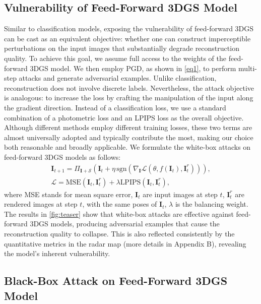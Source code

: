 \documentclass[runningheads]{llncs}
\begin{document}
\subsection{Vulnerability of Feed-Forward 3DGS Model}
Similar to classification models, exposing the vulnerability of feed-forward 3DGS can be cast as an equivalent objective: whether one can construct imperceptible perturbations on the input images that substantially degrade reconstruction quality. To achieve this goal, we assume full access to the weights of the feed-forward 3DGS model. We then employ PGD, as shown in \cref{eq1}, to perform multi-step attacks and generate adversarial examples. Unlike classification, reconstruction does not involve discrete labels. Nevertheless, the attack objective is analogous: to increase the loss by crafting the manipulation of the input along the gradient direction. Instead of a classification loss, we use a standard combination of a photometric loss and an LPIPS loss as the overall objective. Although different methods employ different training losses, these two terms are almost universally adopted and typically contribute the most, making our choice both reasonable and broadly applicable. We formulate the white-box attacks on feed-forward 3DGS models as follows:
\begin{gather}
\label{pgd eq}
    \bm{I}_{t+1} = \Pi_{\bm{I} + \mathcal{S}} \left( \bm{I}_t + \eta \, \text{sgn} \left( \nabla_{\bm{I}} \mathcal{L}(\theta, f(\bm{I}_t), \bm{I}_t^r) \right) \right), \\
    \mathcal{L}=\text{MSE}(\bm{I}_t,\bm{I}_t^r)+\lambda\text{LPIPS}(\bm{I}_t,\bm{I}_t^r),
    \label{loss eq}
\end{gather}
where MSE stands for mean square error, $\bm{I}_t$ are input images at step $t$, $\bm{I}_t^r$ are rendered images at step $t$, with the same poses of $\bm{I}_t$, $\lambda$ is the balancing weight. The results in \cref{fig:teaser} show that white-box attacks are effective against feed-forward 3DGS models, producing adversarial examples that cause the reconstruction quality to collapse. This is also reflected consistently by the quantitative metrics in the radar map (more details in Appendix B), revealing the model’s inherent vulnerability.

\subsection{Black-Box Attack on Feed-Forward 3DGS Model}
\end{document}
